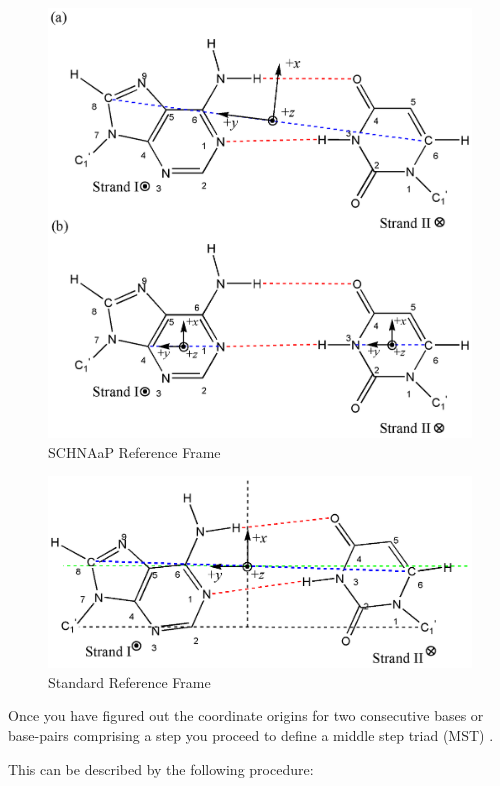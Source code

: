 \begin{figure}[htbp]
\centering
\includegraphics[scale=0.8]{baseandbasepair.png}
\caption{SCHNAaP Reference Frame}
\end{figure}

\begin{figure}[htbp]
\centering
\includegraphics[scale=0.8]{standard.png}
\caption{Standard Reference Frame}
\end{figure}

Once you have  figured out the coordinate origins  for two consecutive
bases or  base-pairs comprising a step you  proceed to define a middle
 step  triad (MST) \cite{lu1997}.

This can be described by the following procedure:

